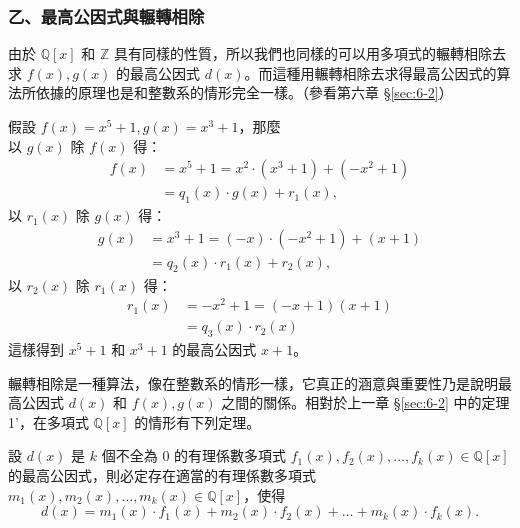 \subsubsection*{乙、最高公因式與輾轉相除}\label{subsec:7-1-b}

由於 $\mathbb{Q}[x]$ 和 $\mathbb{Z}$ 具有同樣的性質，所以我們也同樣的可以用多項式的輾轉相除去求 $f(x), g(x)$ 的最高公因式 $d(x)$。而這種用輾轉相除去求得最高公因式的算法所依據的原理也是和整數系的情形完全一樣。（參看第六章 \S\ref{sec:6-2}）

\begin{example}\label{ex:7-1-3}
假設 $f(x) = x^5+1, g(x) = x^3+1$，那麼\\
以 $g(x)$ 除 $f(x)$ 得：
\begin{align*}
  f(x) &= x^5+1 = x^2 \cdot (x^3+1) + (-x^2+1) \\
  &= q_1(x) \cdot g(x) + r_1(x),
\end{align*}
以 $r_1(x)$ 除 $g(x)$ 得：
\begin{align*}
  g(x) &= x^3+1 = (-x) \cdot (-x^2+1) + (x+1) \\
  &= q_2(x) \cdot r_1(x) + r_2(x),
\end{align*}
以 $r_2(x)$ 除 $r_1(x)$ 得：
\begin{align*}
  r_1(x) &= -x^2+1 = (-x+1)(x+1) \\
  &= q_3(x) \cdot r_2(x)
\end{align*}
這樣得到 $x^5+1$ 和 $x^3+1$ 的最高公因式 $x+1$。
\end{example}

輾轉相除是一種算法，像在整數系的情形一樣，它真正的涵意與重要性乃是說明最高公因式 $d(x)$ 和 $f(x), g(x)$ 之間的關係。相對於上一章 \S\ref{sec:6-2} 中的定理 1'，在多項式 $\mathbb{Q}[x]$ 的情形有下列定理。

\begin{theorem}\label{thm:poly_bezout}
設 $d(x)$ 是 $k$ 個不全為 $0$ 的有理係數多項式 $f_1(x), f_2(x), \dots, f_k(x) \in \mathbb{Q}[x]$ 的最高公因式，則必定存在適當的有理係數多項式 $m_1(x), m_2(x), \dots, m_k(x) \in \mathbb{Q}[x]$，使得
\begin{equation*}
  d(x) = m_1(x) \cdot f_1(x) + m_2(x) \cdot f_2(x) + \dots + m_k(x) \cdot f_k(x).
\end{equation*}
\end{theorem}

